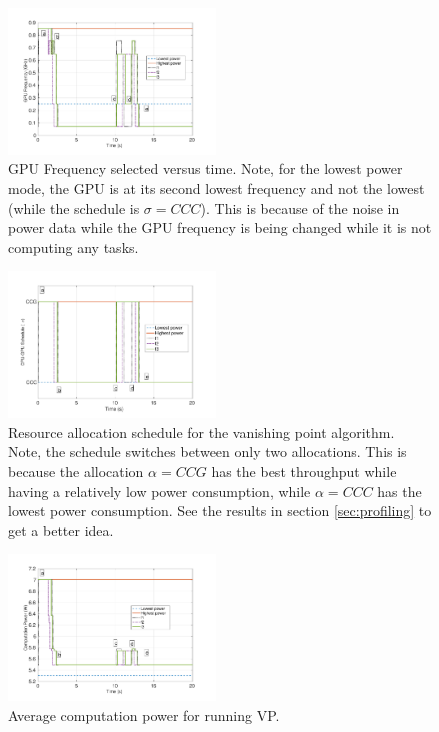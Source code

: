 \begin{figure}[t]
\centering
\includegraphics[width=0.49\textwidth]{../simulations/figs/GPUF.pdf}
\vspace{-20pt}
\caption{GPU Frequency selected versus time. Note, for the lowest power mode, the GPU is at its second lowest frequency and not the lowest (while the schedule is $\sigma=CCC$). This is because of the noise in power data while the GPU frequency is being changed while it is not computing any tasks.}
\label{fig:gpuf} 
\end{figure}


\begin{figure}[t]
\centering
\includegraphics[width=0.49\textwidth]{../simulations/figs/schedule.pdf}
\vspace{-20pt}
\caption{Resource allocation schedule for the vanishing point algorithm. Note, the schedule switches between only two allocations. This is because the allocation $\alpha=CCG$ has the best throughput while having a relatively low power consumption, while $\alpha=CCC$ has the lowest power consumption. See the results in section \ref{sec:profiling} to get a better idea.}
\label{fig:schedule} 
\end{figure}

\begin{figure}[t]
\centering
\includegraphics[width=0.49\textwidth]{../simulations/figs/power.pdf}
\vspace{-20pt}
\caption{Average computation power for running VP.}
\label{fig:power} 
\end{figure}

